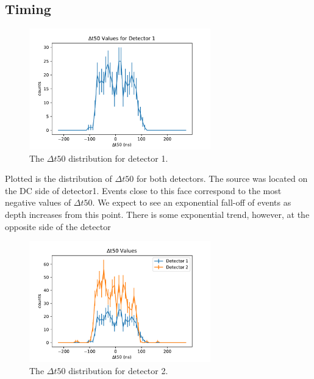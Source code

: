 \subsection*{Timing}

\begin{figure}
\begin{centering}
\includegraphics[width=0.7\textwidth]{./figures/t50s_det1.pdf}
\caption{The $\Delta t50$ distribution for detector 1.}
\label{t50_1}
\end{centering}
\end{figure}

Plotted is the distribution of $\Delta t50$ for both detectors. The source was located on the DC side of detector1. Events close to this face correspond to the most negative values of $\Delta t50$. We expect to see an exponential fall-off of events as depth increases from this point. There is some exponential trend, however, at the opposite side of the detector 

\begin{figure}
\begin{centering}
\includegraphics[width=0.7\textwidth]{./figures/t50s_det2.pdf}
\caption{The $\Delta t50$ distribution for detector 2.}
\label{t50_2}
\end{centering}
\end{figure}

